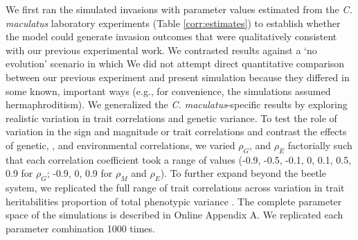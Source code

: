 \documentclass[11pt]{article}
\newcommand{\revise}[1]{{\color{Mahogany}{#1}}}
\begin{document}
We first ran the simulated invasions with parameter values estimated from the \textit{C. maculatus} laboratory experiments (Table \ref{corr:estimates}) to establish whether the model could generate invasion outcomes that were qualitatively consistent with our previous experimental work. %
We contrasted results against a `no evolution' scenario in which %
\revise{genetic variances were set to zero and redistributed across maternal and environmental components such that total phenotypic variances were unchanged.}
We did not attempt direct quantitative comparison between our previous experiment and present simulation because they differed in some known, important ways (e.g., for convenience, the simulations assumed hermaphroditism).%
We generalized the \textit{C. maculatus}-specific results by exploring realistic variation in trait correlations and genetic variance.%
To test the role of variation in the sign and magnitude or trait correlations and contrast the effects of genetic, \revise{maternal}, and environmental correlations, we varied $\rho_{G}$, \revise{$\rho_{M}$,} and $\rho_{E}$ factorially such that each correlation coefficient took a range of values (-0.9, -0.5, -0.1, 0, 0.1, 0.5, 0.9 for $\rho_{G}$; -0.9, 0, 0.9 for $\rho_{M}$ and $\rho_{E}$).
To further expand beyond the beetle system, we replicated the full range of trait correlations across variation in trait heritabilities \revise{by modifying the} proportion of total phenotypic variance \revise{that was genetically based}.
The complete parameter space of the simulations is described in Online Appendix A.
We replicated each parameter combination 1000 times.

\renewcommand{\thetable}{\arabic{table}}
\setcounter{table}{0}
\end{document}
